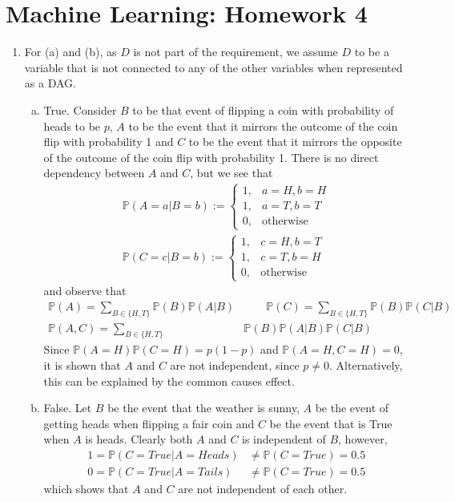 \documentclass[a4paper,10pt]{article}
\theoremstyle{definition}
\begin{document}
\section*{Machine Learning: Homework 4}


\begin{enumerate}
\item For (a) and (b), as $D$ is not part of the requirement, we assume $D$ to be a variable that is not connected to any of the other variables when represented as a DAG.

\begin{enumerate}[(a)]
\item True. Consider $B$ to be that event of flipping a coin with probability of heads to be $p$, $A$ to be the event that it mirrors the outcome of the coin flip with probability 1 and $C$ to be the event that it mirrors the opposite of the outcome of the coin flip with probability 1. There is no direct dependency between $A$ and $C$, but we see that
\begin{align*}
\mathbb{P}(A=a|B=b) :=\begin{cases}
1, & a = H, b = H\\
1, & a=T, b=T\\
0, & \text{otherwise}
 \end{cases}\\
 \mathbb{P}(C=c|B=b) :=\begin{cases}
1, & c = H, b = T\\
1, & c=T, b=H\\
0, & \text{otherwise}
 \end{cases}
\end{align*}
and observe that 
\begin{align*}
\mathbb{P}(A) = \sum_{B\in \{H,T\}}\mathbb{P}(B) \mathbb{P}(A|B) &\qquad \mathbb{P}(C) = \sum_{B\in \{H,T\}}\mathbb{P}(B) \mathbb{P}(C|B) \\
\mathbb{P}(A,C) = \sum_{B\in \{H,T\}}&\mathbb{P}(B)\mathbb{P}(A|B)\mathbb{P}(C|B)
\end{align*}
Since $\mathbb{P}(A=H)\mathbb{P}(C=H) =p(1-p) $ and $\mathbb{P}(A=H,C=H) = 0$, it is shown that $A$ and $C$ are not independent, since $p \neq 0$. Alternatively, this can be explained by the common causes effect.

\item False. Let $B$ be the event that the weather is sunny, $A$ be the event of getting heads when flipping a fair coin and $C$ be the event that is True when $A$ is heads. Clearly both $A$ and $C$ is independent of $B$, however,
\begin{align*}
1 = \mathbb{P}(C=True | A=Heads) &\neq \mathbb{P}(C=True) = 0.5 \\
0 = \mathbb{P}(C=True | A=Tails) &\neq \mathbb{P}(C=True) = 0.5 
\end{align*}	
which shows that $A$ and $C$ are not independent of each other.


\end{enumerate}
\end{enumerate}
\end{document}
